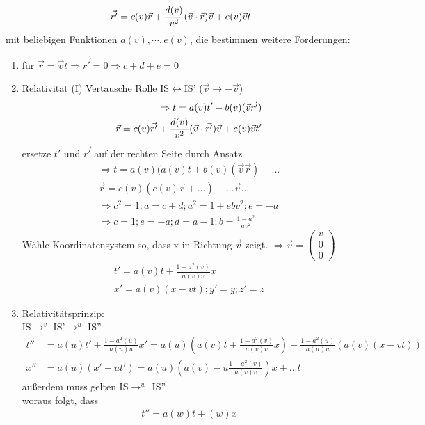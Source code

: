 \begin{description}
\begin{itemize}
\begin{align*}
\vec{r'}=c(v)		\vec{r}+\frac{d(v)}{v^2}	(\vec{v}\cdot\vec{r})\vec{v}+e(v)		\vec{v}t
\end{align*}
mit beliebigen Funktionen $a(v),\cdots,e(v)$, die bestimmen weitere
Forderungen:
\end{itemize}
\begin{enumerate}
\item für $\vec{r}=\vec{v}t \Rightarrow \vec{r'}=0 \Rightarrow c+d+e=0$
\item Relativität (I) Vertausche Rolle IS$\leftrightarrow$IS' ($\vec{v}\rightarrow-\vec{v}$)\\
\begin{align*}
\Rightarrow t=a(v)t'-b(v)(\vec{v}\vec{r'})\\
\vec{r}=c(v)\vec{r'}+\frac{d(v)}{v^2}(\vec{v}\cdot\vec{r'})\vec{v}+e(v)\vec{v}t'
\end{align*}
ersetze $t'$ und $\vec{r'}$ auf der rechten Seite durch Ansatz\\
\begin{align*}\Rightarrow t=a(v)(a(v)t+b(v)(\vec{v}\vec{r})-...\\
\vec{r}=c(v)(c(v)\vec{r}+...)+...\vec{v}...\\
\Rightarrow c^2=1; a=c+d; a^2=1+ebv^2; e=-a\\
\Rightarrow c=1; e=-a; d=a-1; b=\frac{1-a^2}{av^2}
\end{align*}
Wähle Koordinatensystem so, dass x in Richtung $\vec{v}$ zeigt.
$\Rightarrow \vec{v}=\begin{pmatrix}
v\\
0\\
0
\end{pmatrix}$
\begin{align*}
t'=a(v)t+\frac{1-a^2(v)}{a(v)v}x\\
x'=a(v)(x-vt); y'=y; z'=z
\end{align*}
\item Relativitätsprinzip:\\
IS$\rightarrow^v$ IS'$\rightarrow^u$ IS''\\
\begin{align*}
t'' &=a(u)t'+\frac{1-a^2(u)}{a(u)u}x'=a(u)(a(v)t+\frac{1-a^2(v)}{a(v)v}x)+\frac{1-a^2(u)}{a(u)u}(a(v)(x-vt))\\
x'' &=a(u)(x'-ut')=a(u)(a(v)-u\frac{1-a^2(v)}{a(v)v})x+...t
\end{align*}
außerdem muss gelten IS$\rightarrow^w$ IS''\\
woraus folgt, dass
\begin{align*}
t''=a(w)t+(w)x\\

\end{align*}
\end{enumerate}
\end{description}
